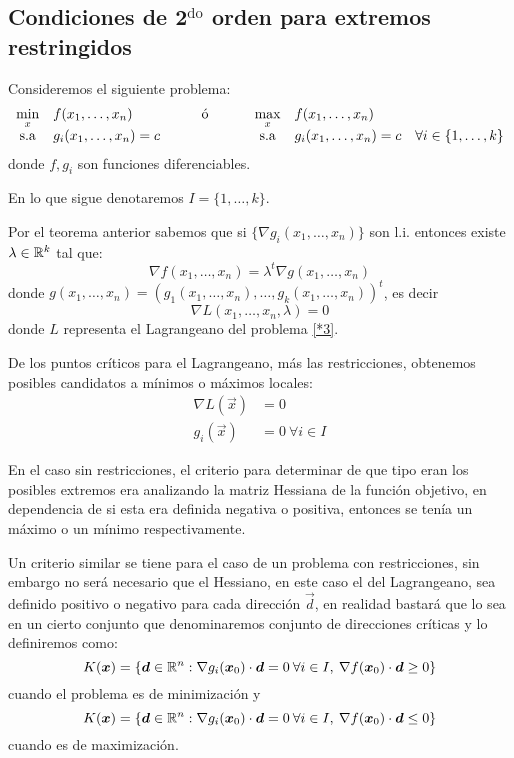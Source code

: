 \subsection{Condiciones de \texorpdfstring{2$^{\text{do}}$}{2do} orden para extremos restringidos}
Consideremos el siguiente problema:%
\begin{equation}\label{*3}
\begin{array}{clcclr}
\displaystyle \min_x 	 & f(x_1,\ldots , x_n) 	   & \text{\qquad \'o \qquad} & \displaystyle \max_x 	 & f(x_1,\ldots , x_n)     & 						  \\
\text{s.a}				 & g_i(x_1,\ldots , x_n)=c &  			 			  & \text{s.a} 			 	 & g_i(x_1,\ldots , x_n)=c & \forall i \in \{1,\ldots , k\}
\end{array}
\end{equation}
donde $f,g_i$ son funciones diferenciables.

\begin{nota}
En lo que sigue denotaremos $I = \{1,\ldots,k\}$.
\end{nota}

Por el teorema anterior sabemos que si $\{\nabla g_i(x_{1},\ldots,x_{n})\}$ son
l.i. entonces existe $\lambda\in\mathbb{R}^{k}$ tal que:%
\[
\nabla f(x_{1},\ldots,x_{n})=\lambda^t\nabla g(x_{1},\ldots,x_{n})
\]
donde $g(x_{1},\ldots,x_{n})=\left(  g_{1}(x_{1},\ldots,x_{n}),\ldots,g_{k}%
(x_{1},\ldots,x_{n})\right)  ^t$, es decir%
\[
\nabla L (x_{1},\ldots,x_{n},\lambda)=0
\]
donde $L$ representa el Lagrangeano del problema \eqref{*3}.

De los puntos cr\'iticos para el Lagrangeano, m\'as las restricciones,
obtenemos posibles candidatos a m\'inimos o m\'aximos locales:%
\begin{align*}
\nabla L(\vec{x}) & =0 \\
g_i(\vec{x})  				& =0 \:\forall i\in I
\end{align*}

En el caso sin restricciones, el criterio para determinar de que tipo eran los
posibles extremos era analizando la matriz Hessiana de la funci\'on
objetivo, en dependencia de si esta era definida negativa o positiva, entonces
se ten\'ia un m\'aximo o un m\'inimo respectivamente.

Un criterio similar se tiene para el caso de un problema con restricciones,
sin embargo no ser\'a necesario que el Hessiano, en este caso el del
Lagrangeano, sea definido positivo o negativo para cada direcci\'on $\vec{d}$, en
realidad bastar\'a que lo sea en un cierto conjunto que denominaremos
conjunto de direcciones cr\'iticas y lo definiremos como:
$$
K(\boldsymbol{x})=\left\{\boldsymbol{d}\in\mathbb{R}^{n}:\nabla g_i(\boldsymbol{x}_0)\cdot \boldsymbol{d}=0\:\forall i\in I,\: \nabla f(\boldsymbol{x}_0)\cdot \boldsymbol{d}\geq 0\right\}
$$
cuando el problema es de minimizaci\'on y
$$
K(\boldsymbol{x})=\left\{\boldsymbol{d}\in\mathbb{R}^{n}:\nabla g_i(\boldsymbol{x}_0)\cdot \boldsymbol{d}=0\:\forall i\in I,\: \nabla f(\boldsymbol{x}_0)\cdot \boldsymbol{d} \leq 0\right\}
$$
cuando es de maximizaci\'on.

